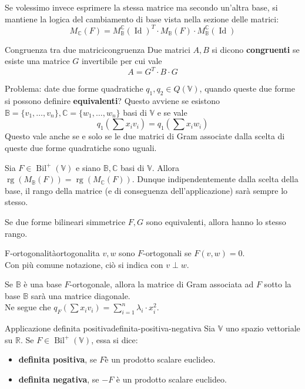 \documentclass[12pt]{report}
\newcommand{\R}{\mathbb{R}}
\newcommand{\C}{\mathbb{C}}
\newcommand{\V}{\mathbb{V}}
\newcommand{\vectors}[1]{#1_1, \dots, #1_n}
\newcommand{\rg}{\operatorname{rg}}
\begin{document}
	Se volessimo invece esprimere la stessa matrice ma secondo un'altra base, si mantiene la logica del cambiamento di base vista nella sezione delle matrici:
	\[
		M_\C(F) = M_{\mathbb{B}}^\C(\operatorname{Id})^T \cdot M_\mathbb{B}(F) \cdot  M_{\mathbb{B}}^\C(\operatorname{Id})
	\]
	
	\begin{definizione}{Congruenza tra due matrici}{congruenza}
		Due matrici $A, B$ si dicono \textbf{congruenti} se esiste una matrice $G$ invertibile per cui vale
		\[
			A = G^T \cdot B \cdot G
		\]
	\end{definizione}
	
	Problema: date due forme quadratiche $q_1, q_2 \in Q(\V)$, quando queste due forme si possono definire \textbf{equivalenti}?
	Questo avviene se esistono $\mathbb{B} = \{\vectors{v}\}, \C = \{\vectors{w}\}$ basi di $\V$ e se vale
	\[
		q_1\left(\sum x_iv_i\right) = q_1\left(\sum x_iw_i\right)
	\]
	Questo vale anche se e solo se le due matrici di Gram associate dalla scelta di queste due forme quadratiche sono uguali.
	
	\begin{proposizione}{}{}
		Sia $F \in \operatorname{Bil}^+(\V)$ e siano $\mathbb{B}, \C$ basi di $\V$. Allora $\rg(M_\mathbb{B}(F)) = \rg(M_\C(F))$.
		Dunque indipendentemente dalla scelta della base, il rango della matrice (e di conseguenza dell'applicazione) sarà sempre lo stesso.
	\end{proposizione}
	
	\begin{proposizione}{}{}
		Se due forme bilineari simmetrice $F, G$ sono equivalenti, allora hanno lo stesso rango.
	\end{proposizione}
	
	\begin{definizione}{F-ortogonalità}{ortogonalita}
		$v, w$ sono $F$-ortogonali se $F(v, w) = 0$.\\
		Con più comune notazione, ciò si indica con $v\perp w$.
	\end{definizione}
	
	\begin{osservazione}{}{}
		Se $\mathbb{B}$ è una base $F$-ortogonale, allora la matrice di Gram associata ad $F$ sotto la base $\mathbb{B}$ sarà una matrice diagonale.\\
		Ne segue che $q_F\left(\sum x_iv_i\right) = \sum_{i=1}^{n} \lambda_i \cdot x_{i}^{2}$.
	\end{osservazione}
	
	\begin{definizione}{Applicazione definita positiva}{definita-positiva-negativa}
		Sia $\V$ uno spazio vettoriale su $\R$. Se $F \in \operatorname{Bil}^+(\V)$, essa si dice:
		\begin{itemize}
			\item \textbf{definita positiva}, se $F$è un prodotto scalare euclideo.
			\item \textbf{definita negativa}, se $-F$ è un prodotto scalare euclideo.
		\end{itemize}
	\end{definizione}
	
\end{document}
